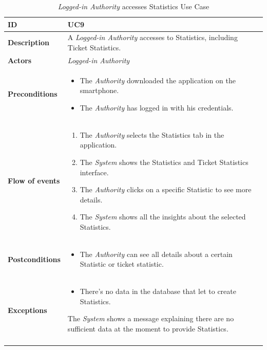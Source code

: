 \documentclass {article}
\begin{document}
	\begin{longtable}{| p{3 cm} | p{10.5 cm} |} 
			\hline
			{\bf ID} & UC9 \\
			\hline
			{\bf Description} & A {\it Logged-in Authority} accesses to Statistics, including Ticket Statistics.\\
			\hline
			{\bf Actors} & {\it Logged-in Authority}\\
			\hline
			{\bf Preconditions} & 	
			\begin{itemize}
				\item The {\it Authority} downloaded the application on the smartphone.
				\item The {\it Authority} has logged in with his credentials.
			\end{itemize}
			\\
			\hline
			{\bf Flow of events} &	
			\begin{enumerate}
				\item The {\it Authority} selects the Statistics tab in the application.
				\item The {\it System} shows the Statistics and Ticket Statistics interface.
				\item The {\it Authority} clicks on a specific Statistic to see more details. 
				\item The {\it System} shows all the insights about the selected Statistics.
			\end{enumerate}
			\\
			\hline
			{\bf Postconditions} & 
			\begin{itemize}
				\item The {\it Authority} can see all details about a certain Statistic or ticket statistic.
			\end{itemize}
			\\
			\hline
			{\bf Exceptions} & 
			\begin{itemize}
				\item There's no data in the database that let to create Statistics.
			\end{itemize}
			The {\it System} shows a message explaining there are no sufficient data at the moment to provide Statistics. \\
			\hline
			\caption{{\it Logged-in Authority} accesses Statistics Use Case}
			\end{longtable}
			\pagebreak
			
			
\end{document}
